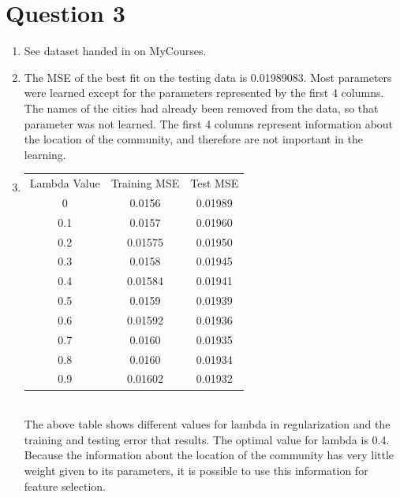\documentclass{article}
\begin{document}
\section*{Question 3}
\begin{enumerate}
\item See dataset handed in on MyCourses.
\item The MSE of the best fit on the testing data is 0.01989083.  Most parameters were learned except for the parameters represented by the first 4 columns.  The names of the cities had already been removed from the data, so that parameter was not learned.  The first 4 columns represent information about the location of the community, and therefore are not important in the learning.
\item \begin{tabular} {c c c}
Lambda Value & Training MSE & Test MSE\\
0 & 0.0156 & 0.01989\\
0.1 & 0.0157& 0.01960\\
0.2 & 0.01575& 0.01950\\
0.3 & 0.0158& 0.01945\\
0.4 & 0.01584& 0.01941\\
0.5 & 0.0159&0.01939\\
0.6 & 0.01592&0.01936\\
0.7 &0.0160&0.01935\\
0.8 & 0.0160&0.01934\\
0.9 &0.01602&0.01932\\
\end{tabular}\\


The above table shows different values for lambda in regularization and the training and testing error that results.  The optimal value for lambda is 0.4.  Because the information about the location of the community has very little weight given to its parameters, it is possible to use this information for feature selection.
\end{enumerate}
\end{document}
